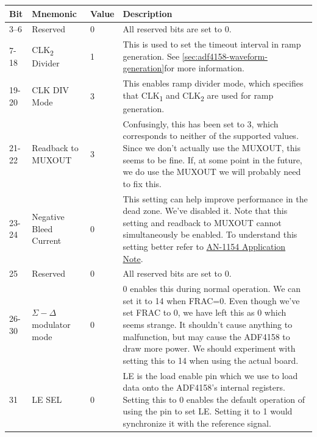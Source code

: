 \label{tab:adf4158-reg-map-4}
\begin{tabularx}{\textwidth}{l l l X}
        \caption{TEST REGISTER(R4) MAP} \\
        \toprule
        Bit & Mnemonic & Value & Description \\
        \midrule

        3--6 & Reserved & 0 & All reserved bits are set to 0. \\
        7-18 & CLK\textsubscript{2} Divider & 1 & This is used to set the timeout interval in ramp
        generation. See
        \cref{sec:adf4158-waveform-generation}for more
        information. \\
        19-20 & CLK DIV Mode & 3 & This enables ramp divider mode, which specifies that
        CLK\textsubscript{1} and CLK\textsubscript{2} are used for ramp
        generation. \\
        21-22 & Readback to MUXOUT & 3 & Confusingly, this has been set to 3, which corresponds to neither
        of the supported values. Since we don't actually use the MUXOUT, this seems to be fine. If, at
        some point in the future, we do use the MUXOUT we will probably
        need to fix this. \\
        23-24 & Negative Bleed Current & 0 & This setting can help improve performance in the dead
        zone. We've disabled it. Note that this setting and readback
        to MUXOUT cannot simultaneously be enabled. To understand
        this setting better refer to \href{http://www.analog.com/media/en/technical-documentation/application-notes/AN-1154.pdf?doc=ADF4158.pdf}{AN-1154
          Application Note}. \\
        25 & Reserved & 0 & All reserved bits are set to 0. \\
        26-30 & $\Sigma-\Delta$ modulator mode & 0 & 0 enables this during normal operation. We can set it
        to 14 when FRAC=0. Even though we've set FRAC to 0,
        we have left this as 0 which seems strange. It
        shouldn't cause anything to malfunction, but may
        cause the ADF4158 to draw more power. We should
        experiment with setting this to 14 when using the
        actual board. \\
        31 & LE SEL & 0 & LE is the load enable pin which we use to load data onto the ADF4158's internal
        registers. Setting this to 0 enables the default operation of using the pin to
        set LE. Setting it to 1 would synchronize it with the reference signal. \\

        \bottomrule
\end{tabularx}

